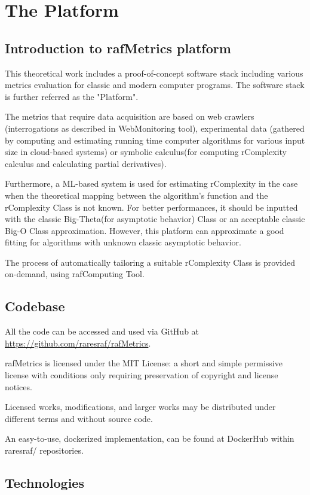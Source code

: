 \chapter{The Platform}


\section{Introduction to rafMetrics platform}
This theoretical work includes a proof-of-concept software stack including various metrics evaluation for classic and modern computer programs. The software stack is further referred as the "Platform".

The metrics that require data acquisition are based on web crawlers (interrogations as described in WebMonitoring tool), experimental data (gathered by computing and estimating running time computer algorithms for various input size in cloud-based systems) or symbolic calculus(for computing rComplexity calculus and calculating partial derivatives).

Furthermore, a ML-based system is used for estimating rComplexity in the case when the theoretical mapping between the algorithm's function and the rComplexity Class is not known. For better performances, it should be inputted with the classic Big-Theta(for asymptotic behavior) Class or an acceptable classic Big-O Class approximation. However, this platform can approximate a good fitting for algorithms with unknown classic asymptotic behavior.

The process of automatically tailoring a suitable rComplexity Class is provided on-demand, using rafComputing Tool.


\section{Codebase}
All the code can be accessed and used via GitHub at \href{https://github.com/raresraf/rafMetrics}{https://github.com/raresraf/rafMetrics}.

rafMetrics is licensed under the MIT License: a short and simple permissive license with conditions only requiring preservation of copyright and license notices. 

Licensed works, modifications, and larger works may be distributed under different terms and without source code.

An easy-to-use, dockerized implementation, can be found at DockerHub within raresraf/ repositories.


\section{Technologies}

